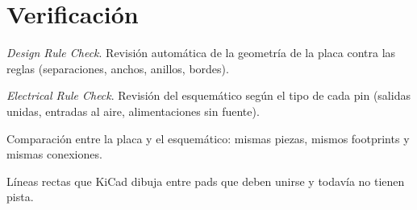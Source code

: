 \section*{Verificación}
\begin{description}[style=sameline,leftmargin=1.5em,labelindent=0pt]
  \item[DRC] \emph{Design Rule Check}. Revisión automática de la geometría de la placa contra las reglas (separaciones,
  anchos, anillos, bordes).
  \item[ERC] \emph{Electrical Rule Check}. Revisión del esquemático según el tipo de cada pin (salidas unidas, entradas
  al aire, alimentaciones sin fuente).
  \item[Paridad] Comparación entre la placa y el esquemático: mismas piezas, mismos footprints y mismas conexiones.
  \item[Ratsnest] Líneas rectas que KiCad dibuja entre pads que deben unirse y todavía no tienen pista.
\end{description}
